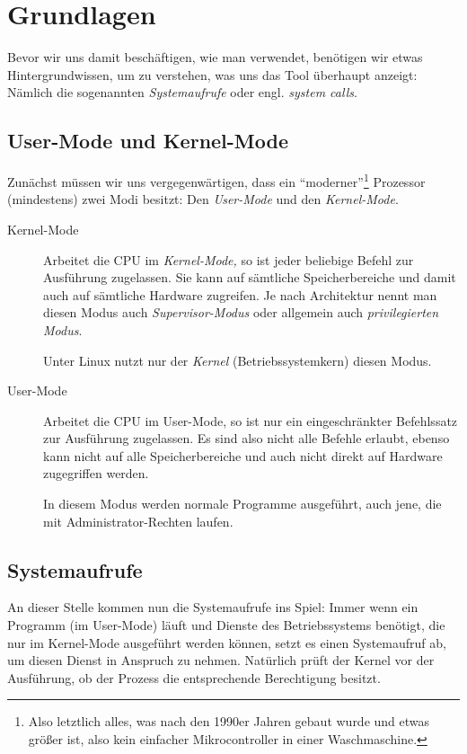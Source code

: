 \section{Grundlagen}

Bevor wir uns damit beschäftigen, wie man \strace{} verwendet, benötigen wir etwas
Hintergrundwissen, um zu verstehen, was uns das Tool überhaupt anzeigt: Nämlich die sogenannten
\emph{Systemaufrufe} oder engl. \emph{system calls}.

\subsection{User-Mode und Kernel-Mode}

Zunächst müssen wir uns vergegenwärtigen, dass ein "`moderner"'\footnote{Also letztlich alles, was
nach den 1990er Jahren gebaut wurde und etwas größer ist, also kein einfacher Mikrocontroller in
einer Waschmaschine.} Prozessor (mindestens) zwei Modi besitzt: Den \emph{User-Mode} und den
\emph{Kernel-Mode}.

\begin{description}
  \item[Kernel-Mode]
    Arbeitet die CPU im \emph{Kernel-Mode,} so ist jeder beliebige Befehl zur Ausführung 
    zugelassen. Sie kann auf sämtliche Speicherbereiche und damit auch auf sämtliche Hardware 
    zugreifen. Je nach Architektur nennt man diesen Modus auch \emph{Supervisor-Modus} oder
    allgemein auch \emph{privilegierten Modus}.

    Unter Linux nutzt nur der \emph{Kernel} (Betriebssystemkern) diesen Modus.

  \item[User-Mode] Arbeitet die CPU im User-Mode, so ist nur ein eingeschränkter Befehlssatz zur
     Ausführung zugelassen. Es sind also nicht alle Befehle erlaubt, ebenso kann nicht auf alle Speicherbereiche und auch nicht direkt auf Hardware zugegriffen werden. 

     In diesem Modus werden normale Programme ausgeführt, auch jene, die mit Administrator-Rechten 
     laufen.
\end{description}

\subsection{Systemaufrufe}

An dieser Stelle kommen nun die Systemaufrufe ins Spiel: Immer wenn ein Programm (im User-Mode)
läuft und Dienste des Betriebssystems benötigt, die nur im Kernel-Mode ausgeführt werden können,
setzt es einen Systemaufruf ab, um diesen Dienst in Anspruch zu nehmen. Natürlich prüft der Kernel
vor der Ausführung, ob der Prozess die entsprechende Berechtigung besitzt.

